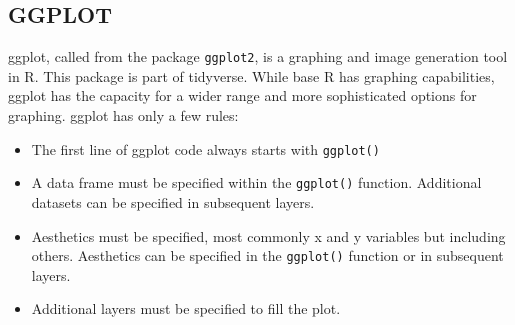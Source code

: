 \documentclass[]{article}
\newenvironment{Shaded}{\begin{snugshade}}{\end{snugshade}}
\newcommand{\KeywordTok}[1]{\textcolor[rgb]{0.13,0.29,0.53}{\textbf{#1}}}
\newcommand{\DataTypeTok}[1]{\textcolor[rgb]{0.13,0.29,0.53}{#1}}
\newcommand{\StringTok}[1]{\textcolor[rgb]{0.31,0.60,0.02}{#1}}
\newcommand{\CommentTok}[1]{\textcolor[rgb]{0.56,0.35,0.01}{\textit{#1}}}
\newcommand{\OperatorTok}[1]{\textcolor[rgb]{0.81,0.36,0.00}{\textbf{#1}}}
\newcommand{\NormalTok}[1]{#1}
\providecommand{\tightlist}{%
  \setlength{\itemsep}{0pt}\setlength{\parskip}{0pt}}
\begin{document}
\begin{Shaded}
\end{Shaded}

\subsection{GGPLOT}\label{ggplot}

ggplot, called from the package \texttt{ggplot2}, is a graphing and
image generation tool in R. This package is part of tidyverse. While
base R has graphing capabilities, ggplot has the capacity for a wider
range and more sophisticated options for graphing. ggplot has only a few
rules:

\begin{itemize}
\tightlist
\item
  The first line of ggplot code always starts with \texttt{ggplot()}
\item
  A data frame must be specified within the \texttt{ggplot()} function.
  Additional datasets can be specified in subsequent layers.
\item
  Aesthetics must be specified, most commonly x and y variables but
  including others. Aesthetics can be specified in the \texttt{ggplot()}
  function or in subsequent layers.
\item
  Additional layers must be specified to fill the plot.
\end{itemize}
\end{document}
